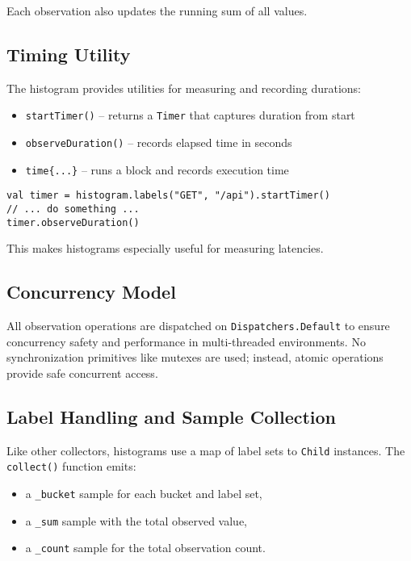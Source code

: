 Each observation also updates the running sum of all values.

\subsection{Timing Utility}

The histogram provides utilities for measuring and recording durations:

\begin{itemize}
    \item \texttt{startTimer()} – returns a \texttt{Timer} that captures duration from start
    \item \texttt{observeDuration()} – records elapsed time in seconds
    \item \texttt{time\{...\}} – runs a block and records execution time
\end{itemize}

\begin{verbatim}
val timer = histogram.labels("GET", "/api").startTimer()
// ... do something ...
timer.observeDuration()
\end{verbatim}

This makes histograms especially useful for measuring latencies.

\subsection{Concurrency Model}

All observation operations are dispatched on \texttt{Dispatchers.Default} to ensure concurrency safety and performance in multi-threaded environments. No synchronization primitives like mutexes are used; instead, atomic operations provide safe concurrent access.

\subsection{Label Handling and Sample Collection}

Like other collectors, histograms use a map of label sets to \texttt{Child} instances. The \texttt{collect()} function emits:

\begin{itemize}
    \item a \texttt{\_bucket} sample for each bucket and label set,
    \item a \texttt{\_sum} sample with the total observed value,
    \item a \texttt{\_count} sample for the total observation count.
\end{itemize}

